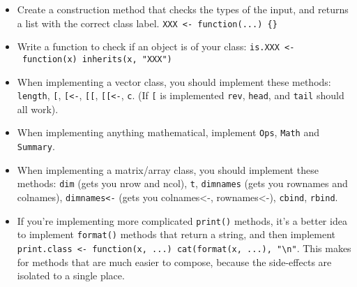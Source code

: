 \begin{itemize}
\item
  Create a construction method that checks the types of the input, and
  returns a list with the correct class label.
  \texttt{XXX\ \textless{}-\ function(...)\ \{\}}
\item
  Write a function to check if an object is of your class:
  \texttt{is.XXX\ \textless{}-\ function(x)\ inherits(x,\ "XXX")}
\item
  When implementing a vector class, you should implement these methods:
  \texttt{length}, \texttt{{[}}, \texttt{{[}\textless{}-},
  \texttt{{[}{[}}, \texttt{{[}{[}\textless{}-}, \texttt{c}. (If
  \texttt{{[}} is implemented \texttt{rev}, \texttt{head}, and
  \texttt{tail} should all work).
\item
  When implementing anything mathematical, implement \texttt{Ops},
  \texttt{Math} and \texttt{Summary}.
\item
  When implementing a matrix/array class, you should implement these
  methods: \texttt{dim} (gets you nrow and ncol), \texttt{t},
  \texttt{dimnames} (gets you rownames and colnames),
  \texttt{dimnames\textless{}-} (gets you colnames\textless{}-,
  rownames\textless{}-), \texttt{cbind}, \texttt{rbind}.
\item
  If you're implementing more complicated \texttt{print()} methods, it's
  a better idea to implement \texttt{format()} methods that return a
  string, and then implement
  \texttt{print.class\ \textless{}-\ function(x,\ ...)\ cat(format(x,\ ...),\ "\textbackslash{}n"}.
  This makes for methods that are much easier to compose, because the
  side-effects are isolated to a single place.
\end{itemize}
